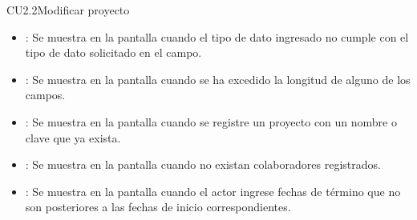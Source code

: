 \begin{UseCase}{CU2.2}{Modificar proyecto}
{\begin{itemize}
		\item {}: Se muestra en la pantalla  cuando el tipo de dato ingresado no cumple con el tipo de dato solicitado en
		el campo.
		\item {}: Se muestra en la pantalla  cuando se ha excedido la longitud de alguno de los campos.
		\item {}: Se muestra en la pantalla  cuando se registre un proyecto con un nombre o clave que ya exista.
		\item {}: Se muestra en la pantalla  cuando no existan colaboradores registrados.
		\item {}: Se muestra en la pantalla  cuando el actor ingrese fechas de término que no son posteriores a las fechas
		de inicio correspondientes.
		\end{itemize}
		}
	\end{UseCase}
